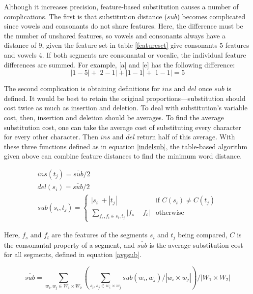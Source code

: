 \documentclass[11pt]{article}
\begin{document}
Although it increases precision, feature-based substitution causes a
number of complications. The first is that substitution distance
($sub$) becomes complicated since vowels and consonants do not share
features.  Here, the difference must be the number of unshared
features, so vowels and consonants always have a distance of 9, given
the feature set in table \ref{featureset} give consonants 5 features
and vowels 4.  If both segments are consonantal or vocalic, the
individual feature differences are summed.  For example, [a] and [e]
has the following difference: \[ |1-5| + |2-1| + |1-1| + |1-1| = 5 \]

The second complication is obtaining definitions for $ins$ and $del$
once $sub$ is defined. It would be best to retain the original
proportions---substitution should cost twice as much as insertion and
deletion. To deal with substitution's variable cost, then, insertion and
deletion should be averages. To find the average substitution cost, one can
 take the average cost of substituting every character
for every other character. Then $ins$ and $del$ return half of this
average. With these three functions defined as in equation
\ref{indelsub}, the table-based algorithm
given above can combine feature distances to find the minimum word distance.

\begin{equation}\begin{array}{l}
   ins(t_j) = \overline{sub} / 2 \\
   del(s_i) = \overline{sub} / 2 \\
   sub(s_i,t_j) = \left\{
     \begin{array}{ll}
       |s_i|+|t_j| & \textrm{if $C(s_i) \ne C(t_j)$} \\
       \sum_{f_s,f_t \in s_i,t_j} |f_s - f_t| & \textrm{otherwise}
     \end{array} \right.

   \end{array}
\label{indelsub}
\end{equation}

Here, $f_s$ and $f_t$ are the features of the segments $s_i$ and $t_j$
being compared, $C$ is the consonantal property of a segment, and
$\overline{sub}$ is the average substitution cost for all segments,
defined in equation \ref{avgsub}.

\begin{equation}
\overline{sub} = \sum_{w_i,w_j \in W_1\times W_2}(\sum_{s_i,s_j \in w_i
  \times w_j}sub(w_i,w_j) / |w_i\times w_j|) / |W_1\times W_2|
\label{avgsub}
\end{equation}
\end{document}
